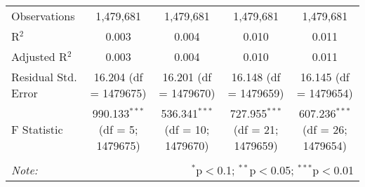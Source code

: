 \documentclass[
]{article}
\begin{document}
\begin{table}[!htbp]
{\begin{tabular}{@{\extracolsep{5pt}}lcccc}
Observations & 1,479,681 & 1,479,681 & 1,479,681 & 1,479,681 \\ 
R$^{2}$ & 0.003 & 0.004 & 0.010 & 0.011 \\ 
Adjusted R$^{2}$ & 0.003 & 0.004 & 0.010 & 0.011 \\ 
Residual Std. Error & 16.204 (df = 1479675) & 16.201 (df = 1479670) & 16.148 (df = 1479659) & 16.145 (df = 1479654) \\ 
F Statistic & 990.133$^{***}$ (df = 5; 1479675) & 536.341$^{***}$ (df = 10; 1479670) & 727.955$^{***}$ (df = 21; 1479659) & 607.236$^{***}$ (df = 26; 1479654) \\ 
\hline 
\hline \\[-1.8ex] 
\textit{Note:}  & \multicolumn{4}{r}{$^{*}$p$<$0.1; $^{**}$p$<$0.05; $^{***}$p$<$0.01} \\ 
\end{tabular}
} 
\end{table} 
\newpage
\end{document}
